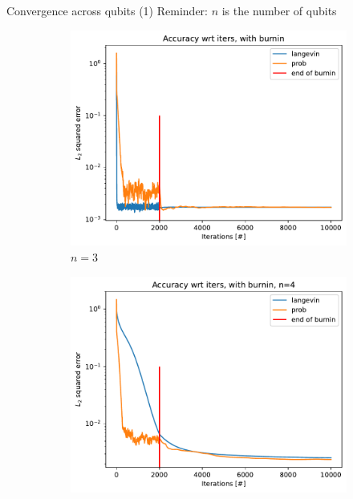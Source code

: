 \documentclass{beamer}
\begin{document}
\begin{frame}{Convergence across qubits (1)}
    Reminder: $n$ is the number of qubits
    \begin{figure}[H]

        \centering
    
        \begin{subfigure}[b]{0.38\textwidth}
    
    
            \centering
    
            \includegraphics[width=\textwidth]{figures/experiments/baseline/diff_n_qubits/iters_acc_comp_iters_no_avg-1.png}
    
            \caption{$n=3$}
        
        \end{subfigure}
        \hfill
        \begin{subfigure}[b]{0.38\textwidth}
    
    
            \centering
    
            \includegraphics[width=\textwidth]{figures/experiments/baseline/diff_n_qubits/iters_acc_comp_iters_no_avg_n4-1.png}
    

\end{subfigure}
\end{figure}
\end{frame}
\end{document}
